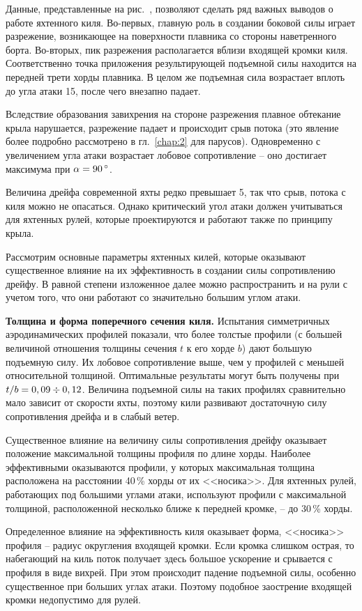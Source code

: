 Данные, представленные на рис.~, позволяют сделать ряд важных выводов о работе яхтенного киля. Во-первых, главную роль в создании боковой силы играет разрежение, возникающее на поверхности плавника со стороны наветренного борта. Во-вторых, пик разрежения располагается вблизи входящей кромки киля. Соответственно точка приложения результирующей подъемной силы находится на передней трети хорды плавника. В целом же подъемная сила возрастает вплоть до угла атаки 15\gr, после чего внезапно падает.

Вследствие образования завихрения на стороне разрежения плавное обтекание крыла нарушается, разрежение падает и происходит срыв потока (это явление более подробно рассмотрено в гл.~\ref{chap:2} для парусов). Одновременно с увеличением угла атаки возрастает лобовое сопротивление \--- оно достигает максимума при $\alpha = 90\,^\circ$.

Величина дрейфа современной яхты редко превышает 5\gr, так что срыв, потока с киля можно не опасаться. Однако критический угол атаки должен учитываться для яхтенных рулей, которые проектируются и работают также по принципу крыла. 

Рассмотрим основные параметры яхтенных килей, которые оказывают существенное влияние на их эффективность в создании силы сопротивлению дрейфу. В равной степени изложенное далее можно распространить и на рули с учетом того, что они работают со значительно большим углом атаки.

\textbf{Толщина и форма поперечного сечения киля.} Испытания симметричных аэродинамических профилей показали, что более толстые профили (с большей величиной отношения толщины сечения $t$ к его хорде $b$) дают большую подъемную силу. Их лобовое сопротивление выше, чем у профилей с меньшей относительной толщиной. Оптимальные результаты могут быть получены при $t/b = 0,09 \div 0,12$. Величина подъемной силы на таких профилях сравнительно мало зависит от скорости яхты, поэтому кили развивают достаточную силу сопротивления дрейфа и в слабый ветер. 

Существенное влияние на величину силы сопротивления дрейфу оказывает положение максимальной толщины профиля по длине хорды. Наиболее эффективными оказываются профили, у которых максимальная толщина расположена на расстоянии 40\,\% хорды от их <<носика>>. Для яхтенных рулей, работающих под большими углами атаки, используют профили с максимальной толщиной, расположенной несколько ближе к передней кромке, \--- до 30\,\% хорды.

Определенное влияние на эффективность киля оказывает форма, <<носика>> профиля \--- радиус округления входящей кромки. Если кромка слишком острая, то набегающий на киль поток получает здесь большое ускорение и срывается с профиля в виде вихрей. При этом происходит падение подъемной силы, особенно существенное при больших углах атаки. Поэтому подобное заострение входящей кромки недопустимо для рулей. 

